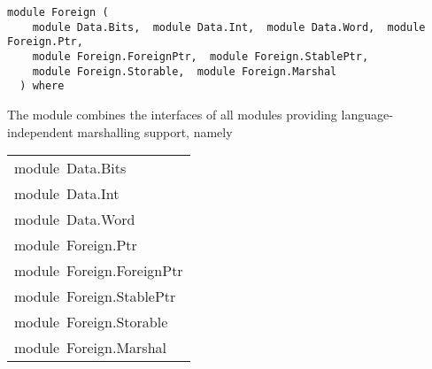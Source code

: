 \label{module:Foreign}
\haddockbeginheader
{\haddockverb\begin{verbatim}
module Foreign (
    module Data.Bits,  module Data.Int,  module Data.Word,  module Foreign.Ptr, 
    module Foreign.ForeignPtr,  module Foreign.StablePtr, 
    module Foreign.Storable,  module Foreign.Marshal
  ) where\end{verbatim}}
\haddockendheader

The module  combines the interfaces of all
 modules providing language-independent marshalling support,
 namely
\par

\begin{haddockdesc}
\item[\begin{tabular}{@{}l}
module\ Data.Bits\\module\ Data.Int\\module\ Data.Word\\module\ Foreign.Ptr\\module\ Foreign.ForeignPtr\\module\ Foreign.StablePtr\\module\ Foreign.Storable\\module\ Foreign.Marshal
\end{tabular}]
\end{haddockdesc}